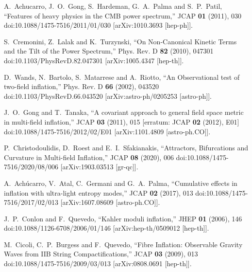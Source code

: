 \documentclass[a4paper,11pt]{article}
\begin{document}
\begin{thebibliography}{10}
A.~Achucarro, J.~O.~Gong, S.~Hardeman, G.~A.~Palma and S.~P.~Patil,
``Features of heavy physics in the CMB power spectrum,''
JCAP \textbf{01} (2011), 030
doi:10.1088/1475-7516/2011/01/030
[arXiv:1010.3693 [hep-ph]].

S.~Cremonini, Z.~Lalak and K.~Turzynski,
``On Non-Canonical Kinetic Terms and the Tilt of the Power Spectrum,''
Phys. Rev. D \textbf{82} (2010), 047301
doi:10.1103/PhysRevD.82.047301
[arXiv:1005.4347 [hep-th]].

D.~Wands, N.~Bartolo, S.~Matarrese and A.~Riotto,
``An Observational test of two-field inflation,''
Phys. Rev. D \textbf{66} (2002), 043520
doi:10.1103/PhysRevD.66.043520
[arXiv:astro-ph/0205253 [astro-ph]].

J.~O.~Gong and T.~Tanaka,
``A covariant approach to general field space metric in multi-field inflation,''
JCAP \textbf{03} (2011), 015
[erratum: JCAP \textbf{02} (2012), E01]
doi:10.1088/1475-7516/2012/02/E01
[arXiv:1101.4809 [astro-ph.CO]].

P.~Christodoulidis, D.~Roest and E.~I.~Sfakianakis,
``Attractors, Bifurcations and Curvature in Multi-field Inflation,''
JCAP \textbf{08} (2020), 006
doi:10.1088/1475-7516/2020/08/006
[arXiv:1903.03513 [gr-qc]].

A.~Ach\'ucarro, V.~Atal, C.~Germani and G.~A.~Palma,
``Cumulative effects in inflation with ultra-light entropy modes,''
JCAP \textbf{02} (2017), 013
doi:10.1088/1475-7516/2017/02/013
[arXiv:1607.08609 [astro-ph.CO]].

J.~P.~Conlon and F.~Quevedo,
``Kahler moduli inflation,''
JHEP \textbf{01} (2006), 146
doi:10.1088/1126-6708/2006/01/146
[arXiv:hep-th/0509012 [hep-th]].

M.~Cicoli, C.~P.~Burgess and F.~Quevedo,
``Fibre Inflation: Observable Gravity Waves from IIB String Compactifications,''
JCAP \textbf{03} (2009), 013
doi:10.1088/1475-7516/2009/03/013
[arXiv:0808.0691 [hep-th]].


\end{thebibliography}
\end{document}
